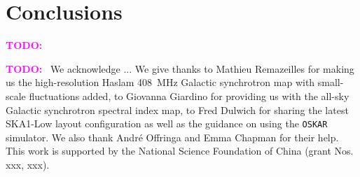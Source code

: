\documentclass[modern]{aastex61}
\newcommand{\TODO}[1]{\textcolor{magenta}{\textbf{TODO:}}~\uuline{#1}}
\begin{document}
\section{Conclusions}
\label{sec:conclusions}

\TODO{Write!!!}


\acknowledgments

\TODO{[update]}
We acknowledge ...
\color{magenta}
We give thanks
to Mathieu Remazeilles for making us the high-resolution Haslam \SI{408}{\MHz}
Galactic synchrotron map with small-scale fluctuations added,
to Giovanna Giardino for providing us with the all-sky Galactic synchrotron
spectral index map,
to Fred Dulwich for sharing the latest SKA1-Low layout configuration as well
as the guidance on using the \texttt{OSKAR} simulator.
We also thank Andr\'e Offringa and Emma Chapman for their help.
This work is supported by the National Science Foundation of China
(grant Nos. xxx, xxx).
\color{black}


%

\vspace{5mm}



\end{document}
